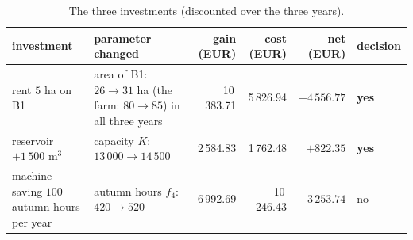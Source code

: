 \begin{table}[!ht]
\centering\footnotesize
\begin{tabular}{p{3.2cm}p{4.2cm}rrrl}
\toprule
investment & parameter changed & gain (EUR) & cost (EUR) & net (EUR) & decision\\
\midrule
rent $5$ ha on B1 & area of B1: $26\to31$ ha (the farm: $80\to85$) in all three years & 10\,383.71 & 5\,826.94 & $+4\,556.77$ & \textbf{yes}\\
reservoir $+1\,500$ m$^3$ & capacity $K$: $13\,000\to14\,500$ & 2\,584.83 & 1\,762.48 & $+822.35$ & \textbf{yes}\\
machine saving $100$ autumn hours per year & autumn hours $f_4$: $420\to 520$ & 6\,992.69 & 10\,246.43 & $-3\,253.74$ & no\\
\bottomrule
\end{tabular}
\caption{The three investments (discounted over the three years).}
\end{table}
